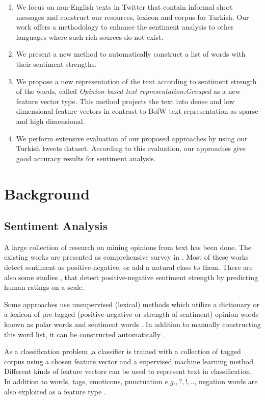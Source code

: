 \documentclass[12pt]{article}
\begin{document}
\begin{enumerate}%


 \item We focus on non-English texts in Twitter that contain informal short messages and construct our resources, lexicon and corpus for Turkish. Our work offers a methodology to enhance the sentiment analysis to other languages where such rich sources do not exist.
\item We present a new method to automatically construct a list of words with their sentiment strengths.
\item We propose a new representation of the text according to sentiment strength of the words, called  \textit{Opinion-based text representation:Grouped} as a new feature vector type. This method projects the text into dense and low dimensional feature vectors in contrast to BofW text representation as sparse and high dimensional.
\item We perform extensive evaluation of our proposed approaches by using our Turkish tweets dataset. According to this evaluation, our approaches give good accuracy results for sentiment analysis.
\end{enumerate}

\section{Background}

\subsection{Sentiment Analysis}

A large collection of research on mining opinions from text has been
done. The existing works are presented as comprehensive survey in \cite{BobLiu12,PANGLEE}. Most of these works detect sentiment as positive-negative, or
add a natural class to them. There are also some studies
\cite{2,TSS}, that detect positive-negative sentiment strength by
predicting human ratings on a scale.

Some approaches use unsupervised (lexical) methods which  utilize a dictionary or a lexicon of pre-tagged (positive-negative or strength of sentiment) opinion words known as polar words and sentiment words \cite{9,2,11}. In addition to manually constructing this word list, it can be constructed automatically \cite{JK04,WPDMLA}.

As a classification problem \cite{28,16},a classifier is trained with a collection of tagged corpus using a chosen feature vector and a supervised machine learning method.  Different kinds of feature vectors can be used to represent text in classification. In addition to words,  tags, emoticons, punctuation \(e.g., ?, !,..\), negation words are also exploited as a feature type \cite{18,19,7,PANGLEE}. 
\end{document}
